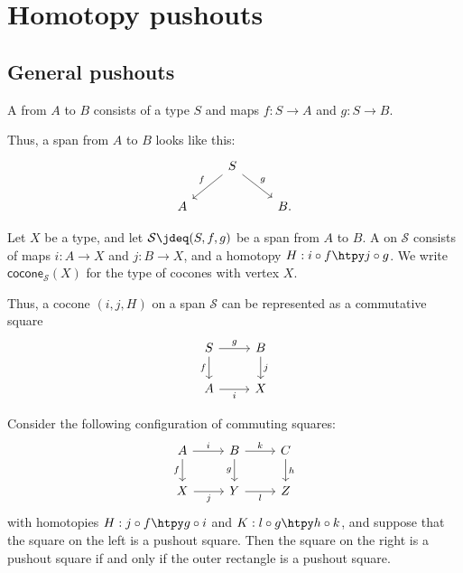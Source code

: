 \chapter{Homotopy pushouts}

\section{General pushouts}

\begin{defn}
A  from $A$ to $B$ consists of a type $S$ and maps $f:S\to A$ and $g:S\to B$. 
\end{defn}
Thus, a span from $A$ to $B$ looks like this:
\begin{equation*}
\begin{tikzcd}
& S \arrow[dl,swap,"f"] \arrow[dr,"g"] \\
A & & B.
\end{tikzcd}
\end{equation*}

\begin{defn}
Let $X$ be a type, and let $\mathcal{S}\jdeq (S,f,g)$ be a span from $A$ to $B$.
A  on $\mathcal{S}$ consists of maps $i:A\to X$ and $j:B\to X$, and a homotopy $H:i\circ f\htpy j\circ g$.
We write $\mathsf{cocone}_{\mathcal{S}}(X)$ for the type of cocones with vertex $X$.
\end{defn}

Thus, a cocone $(i,j,H)$ on a span $\mathcal{S}$ can be represented as a commutative square
\begin{equation*}
\begin{tikzcd}
S \arrow[r,"g"] \arrow[d,swap,"f"] & B \arrow[d,"j"] \\
A \arrow[r,swap,"i"] & X 
\end{tikzcd}
\end{equation*}

\begin{defn}

\end{defn}

\begin{thm}
Consider the following configuration of commuting squares:
\begin{equation*}
\begin{tikzcd}
A \arrow[r,"i"] \arrow[d,swap,"f"] & B \arrow[r,"k"] \arrow[d,swap,"g"] & C \arrow[d,"h"] \\
X \arrow[r,swap,"j"] & Y \arrow[r,swap,"l"] & Z
\end{tikzcd}
\end{equation*}
with homotopies $H:j\circ f\htpy g\circ i$ and $K:l\circ g\htpy h\circ k$, and suppose that the square on the left is a pushout square. 
Then the square on the right is a pushout square if and only if the outer rectangle is a pushout square.
\end{thm}

